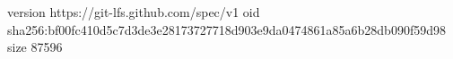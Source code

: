 version https://git-lfs.github.com/spec/v1
oid sha256:bf00fc410d5c7d3de3e28173727718d903e9da0474861a85a6b28db090f59d98
size 87596

